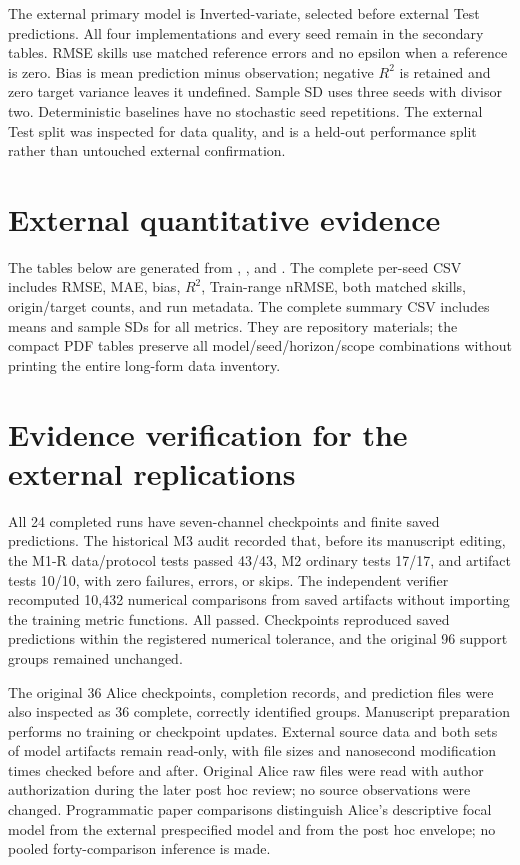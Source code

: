 The external primary model is Inverted-variate, selected before external Test predictions. All four implementations and every seed remain in the secondary tables. RMSE skills use matched reference errors and no epsilon when a reference is zero. Bias is mean prediction minus observation; negative $R^2$ is retained and zero target variance leaves it undefined. Sample SD uses three seeds with divisor two. Deterministic baselines have no stochastic seed repetitions. The external Test split was inspected for data quality, and is a held-out performance split rather than untouched external confirmation.

\section{External quantitative evidence}
The tables below are generated from , , and . The complete per-seed CSV includes RMSE, MAE, bias, $R^2$, Train-range nRMSE, both matched skills, origin/target counts, and run metadata. The complete summary CSV includes means and sample SDs for all metrics. They are repository materials; the compact PDF tables preserve all model/seed/horizon/scope combinations without printing the entire long-form data inventory.

\begingroup\small\setlength{\tabcolsep}{3pt}

\endgroup

\section{Evidence verification for the external replications}
All 24 completed runs have seven-channel checkpoints and finite saved predictions. The historical M3 audit recorded that, before its manuscript editing, the M1-R data/protocol tests passed 43/43, M2 ordinary tests 17/17, and artifact tests 10/10, with zero failures, errors, or skips. The independent verifier recomputed 10,432 numerical comparisons from saved artifacts without importing the training metric functions. All passed. Checkpoints reproduced saved predictions within the registered numerical tolerance, and the original 96 support groups remained unchanged.

The original 36 Alice checkpoints, completion records, and prediction files were also inspected as 36 complete, correctly identified groups. Manuscript preparation performs no training or checkpoint updates. External source data and both sets of model artifacts remain read-only, with file sizes and nanosecond modification times checked before and after. Original Alice raw files were read with author authorization during the later post hoc review; no source observations were changed. Programmatic paper comparisons distinguish Alice's descriptive focal model from the external prespecified model and from the post hoc envelope; no pooled forty-comparison inference is made.

